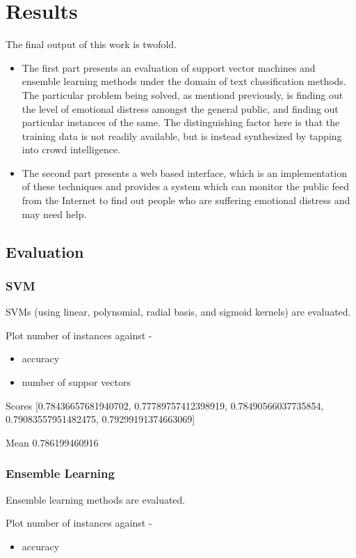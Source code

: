 \chapter{Results}
\label{chapter:Results}

The final output of this work is twofold.
\begin{itemize}
    \item{The first part presents an evaluation of support vector machines and ensemble learning methods under the domain of text classification methods. The particular problem being solved, as mentiond previously, is finding out the level of emotional distress amongst the general public, and finding out particular instances of the same. The distinguishing factor here is that the training data is not readily available, but is instead synthesized by tapping into crowd intelligence.}
    \item{The second part presents a web based interface, which is an implementation of these techniques and provides a system which can monitor the public feed from the Internet to find out people who are suffering emotional distress and may need help.}
\end{itemize}

\section{Evaluation}
\subsection{SVM}
SVMs (using linear, polynomial, radial basis, and sigmoid kernels) are evaluated.

Plot number of instances against -
\begin{itemize}
    \item{accuracy}
    \item{number of suppor vectors}
\end{itemize}

Scores [0.78436657681940702, 0.77789757412398919, 0.78490566037735854, 0.79083557951482475, 0.79299191374663069]

Mean 0.786199460916

\subsection{Ensemble Learning}
Ensemble learning methods are evaluated.

Plot number of instances against -
\begin{itemize}
    \item{accuracy}
\end{itemize}

